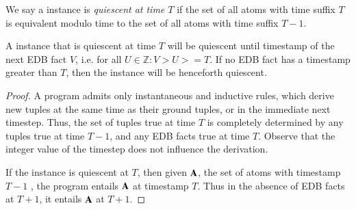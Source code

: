 
\begin{definition}
%
We say a \slang instance is \emph{quiescent at time $T$} if the set of all
atoms with time suffix $T$ is equivalent modulo time to the set of all atoms
with time suffix $T-1$.
\end{definition}


\begin{observation}
%
A \slang instance that is quiescent at time $T$ will be quiescent until
timestamp of the next EDB fact $V$, i.e. for all $U \in \mathbb{Z}: V > U >=
T$.  If no EDB fact has a timestamp greater than $T$, then the instance will be
henceforth quiescent.
%
\end{observation}
%
\begin{proof}
%
A \slang program admits only instantaneous and inductive rules, which derive
new tuples at the same time as their ground tuples, or in the immediate next
timestep.  Thus, the set of tuples true at time $T$ is completely determined by
any tuples true at time $T-1$, and any EDB facts true at time $T$.  Observe
that the integer value of the timestep does not influence the derivation.

If the instance is quiescent at $T$, then given ${\bf A}$, the set of atoms
with timestamp $T-1$ , the program entails ${\bf
A}$ at timestamp $T$.  Thus in the absence of EDB facts at $T+1$, it entails
${\bf A}$ at $T+1$.
%
\end{proof}

